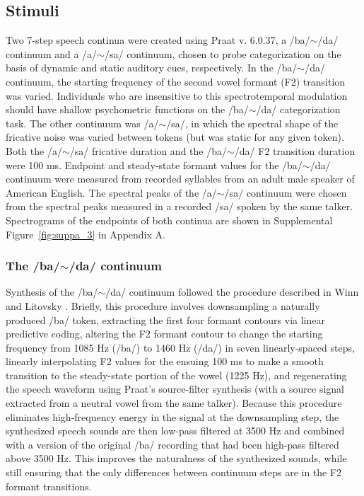\documentclass[../uwthesis.tex]{subfiles}
\begin{document}
\subsection{Stimuli}
Two 7-step speech continua were created using Praat v. 6.0.37\citep{Boersma2019Praat:Computer}, a /ba/$\sim$/da/ continuum and a /a/$\sim$/sa/ continuum, chosen to probe categorization on the basis of dynamic and static auditory cues, respectively. In the /ba/$\sim$/da/ continuum, the starting frequency of the second vowel formant (F2) transition was varied. Individuals who are insensitive to this spectrotemporal modulation should have shallow psychometric functions on the /ba/$\sim$/da/ categorization task. The other continuum was /a/$\sim$/sa/, in which the spectral shape of the fricative noise was varied between tokens (but was static for any given token). Both the /a/$\sim$/sa/ fricative duration and the /ba/$\sim$/da/ F2 transition duration were 100 ms. Endpoint and steady-state formant values for the /ba/$\sim$/da/ continuum were measured from recorded syllables from an adult male speaker of American English. The spectral peaks of the /a/$\sim$/sa/ continuum were chosen from the spectral peaks measured in a recorded /sa/ spoken by the same talker. Spectrograms of the endpoints of both continua are shown in Supplemental Figure~\ref{fig:suppa_3} in Appendix A.

\subsubsection{The /ba/$\sim$/da/ continuum}
Synthesis of the /ba/$\sim$/da/ continuum followed the procedure described in Winn and Litovsky \citep{Winn2015}. Briefly, this procedure involves downsampling a naturally produced /ba/ token, extracting the first four formant contours via linear predictive coding, altering the F2 formant contour to change the starting frequency from 1085 Hz (/ba/) to 1460 Hz (/da/) in seven linearly-spaced steps, linearly interpolating F2 values for the ensuing 100 ms to make a smooth transition to the steady-state portion of the vowel (1225 Hz), and regenerating the speech waveform using Praat's source-filter synthesis (with a source signal extracted from a neutral vowel from the same talker). Because this procedure eliminates high-frequency energy in the signal at the downsampling step, the synthesized speech sounds are then low-pass filtered at 3500 Hz and combined with a version of the original /ba/ recording that had been high-pass filtered above 3500 Hz. This improves the naturalness of the synthesized sounds, while still ensuring that the only differences between continuum steps are in the F2 formant transitions.
\end{document}
